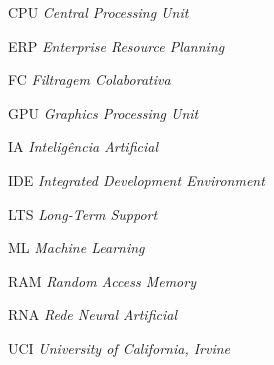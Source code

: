 \documentclass[
	12pt,	%
	openright,			%
	oneside,            %
	a4paper,			%
	english,			%
	french,				%
	spanish,			%
	brazil				%
]{abntex2}
\newcommand{\listofquadrosname}{Lista de quadros}
\begin{document}


\begin{siglas}
    \item [CPU] \textit{Central Processing Unit}
    \item [ERP] \textit{Enterprise Resource Planning}
    \item [FC] \textit{Filtragem Colaborativa}
    \item [GPU] \textit{Graphics Processing Unit}
    \item [IA] \textit{Inteligência Artificial}
    \item [IDE] \textit{Integrated Development Environment}
    \item [LTS] \textit{Long-Term Support}
    \item [ML] \textit{Machine Learning}
    \item [RAM] \textit{Random Access Memory}
    \item [RNA] \textit{Rede Neural Artificial}
    \item [UCI] \textit{University of California, Irvine}
\end{siglas}

\tableofcontents*
\cleardoublepage

\textual








\postextual


\end{document}
